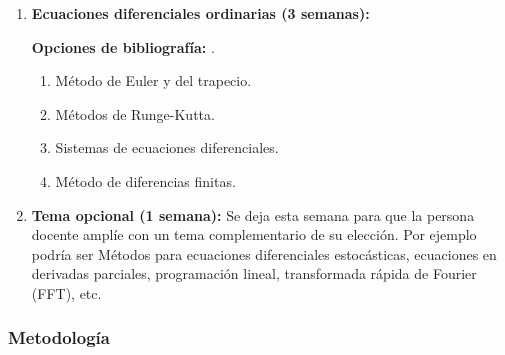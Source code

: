 \begin{refsection}
\begin{enumerate}
\textbf{Opciones de bibliografía:} \cite{trefethen97}.

\begin{enumerate}
	\item Algoritmos de diferentes factorizaciones (LU, QR, Cholesky, valores singulares).
	\item Resolución numérica de sistemas de ecuaciones lineales.
	\item Métodos iterativos para la resolución de sistemas de ecuaciones (Jacobi, Gauss-Seidel, gradiente con búsqueda de línea).
\item Valores y vectores propios (Jacobi, Sturm, iteración de potencias, QR).
	\item Problema de mínimos cuadrados. Mejor aproximación en la 2-norma.
	\item Sistemas de ecuaciones no lineales (Newton en varias variables).
	\item Aplicaciones de valores singulares.
\end{enumerate}
	
\item \textbf{Ecuaciones diferenciales ordinarias (3 semanas):}

\textbf{Opciones de bibliografía:} \cite{Quarteroni,Suli2003}.

\begin{enumerate}
	\item Método de Euler y del trapecio.
	\item Métodos de Runge-Kutta.
	\item Sistemas de ecuaciones diferenciales.
	\item Método de diferencias finitas.
\end{enumerate}

\item \textbf{Tema opcional (1 semana):}   Se deja esta semana para que la persona docente amplíe con un tema complementario de su elección. Por ejemplo podría ser Métodos para ecuaciones diferenciales estocásticas, ecuaciones en derivadas parciales, programación lineal, transformada rápida de Fourier (FFT), etc.
\nocite{Zhang}

\end{enumerate}


\subsubsection*{Metodología}


\end{refsection}
